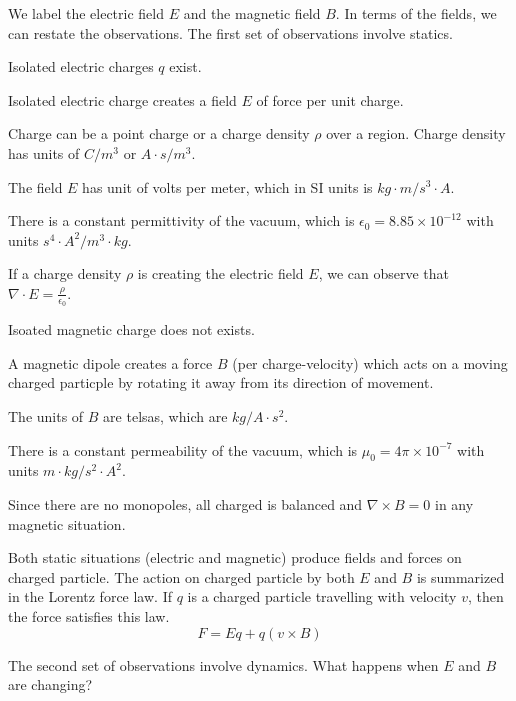 \documentclass[fleqn,letterpaper]{report}
\begin{document}
We label the electric field $E$ and the magnetic field $B$. 
In terms of the fields, we can restate the
observations. The first set of observations involve statics.

\begin{smallitemize}
\item Isolated electric charges $q$ exist.
\item Isolated electric charge creates a field $E$ of force per
unit charge.
\item Charge can be a point charge or a charge density $\rho$
over a region. Charge density has units of $C/m^3$ or $A
\cdot s/m^3$. 
\item The field $E$ has unit of volts per meter, which in SI
units is $kg \cdot m / s^3 \cdot A$.
\item There is a constant permittivity of the vacuum, which is
$\epsilon_0 = 8.85 \times 10^{-12}$ with units $s^4 \cdot
A^2/m^3 \cdot kg$. 
\item If a charge density $\rho$ is creating the electric
field $E$, we can observe that $\nabla \cdot E =
\frac{\rho}{\epsilon_0}$.
\item Isoated magnetic charge does not exists.
\item A magnetic dipole creates a force $B$ (per charge-velocity)
which acts on a moving charged particple by rotating it away
from its direction of movement.
\item The units of $B$ are telsas, which are $kg/A\cdot s^2$. 
\item There is a constant permeability of the vacuum, which is
$\mu_0 = 4\pi \times 10^{-7}$ with units $m \cdot kg / s^2
\cdot A^2$.
\item Since there are no monopoles, all charged is balanced and
$\nabla \times B = 0$ in any magnetic situation.
\end{smallitemize}

Both static situations (electric and magnetic) produce fields
and forces on charged particle. 
The action on charged particle by both $E$ and $B$ is
summarized in the Lorentz force law. If $q$ is a charged
particle travelling with velocity $v$, then the force
satisfies this law.
\begin{equation*}
F = Eq + q (v \times B)
\end{equation*}

The second set of observations involve dynamics. What happens
when $E$ and $B$ are changing?
\end{document}
